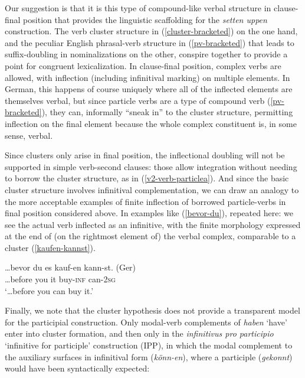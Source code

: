 \documentclass[output=paper]{langscibook}
\begin{document}
Our suggestion is that it is this type of compound-like verbal structure in clause-final position that provides the linguistic scaffolding for the \textit{setten uppen} construction. The verb cluster structure in (\ref{cluster-bracketed}) on the one hand, and the peculiar English phrasal-verb structure in (\ref{pv-bracketed}) that leads to suffix-doubling in nominalizations on the other, conspire together to provide a point for congruent lexicalization. In clause-final position, complex verbs are allowed, with inflection (including infinitival marking) on multiple elements. In German, this happens of course uniquely where all of the inflected elements are themselves verbal, but since particle verbs are a type of compound verb (\ref{pv-bracketed}), they can, informally ``sneak in'' to the cluster structure, permitting inflection on the final element because the whole complex constituent is, in some sense, verbal. 

Since clusters only arise in final position, the inflectional doubling will not be supported in simple verb-second clauses: those allow integration without needing to borrow the cluster structure, as in (\ref{v2-verb-particlea}). And since the basic cluster structure involves infinitival complementation, we can draw an analogy to the more acceptable examples of finite inflection of borrowed particle-verbs in final position considered above. In examples like (\ref{bevor-du}), repeated here: we see the actual verb inflected as an infinitive, with the finite morphology expressed at the end of (on the rightmost element of) the verbal complex, comparable to a cluster (\ref{kaufen-kannst}).

\ea
{} 
\z\z 
\ea\gll \label{kaufen-kannst}\ldots bevor du es kauf-en kann-st. (Ger)\\
\ldots before you it buy-\textsc{inf} can-\textsc{2sg}\\
\glt `\ldots before you can buy it.'
\z 

Finally, we note that the cluster hypothesis does not provide a transparent model for the participial construction. Only modal-verb complements of \textit{haben} `have' enter into cluster formation, and then only in the \textit{infinitivus pro participio} ‘infinitive for participle’ construction (IPP), in which the modal complement to the auxiliary surfaces in infinitival form (\textit{könn-en}), where a participle (\textit{gekonnt}) would have been syntactically expected:
\end{document}
